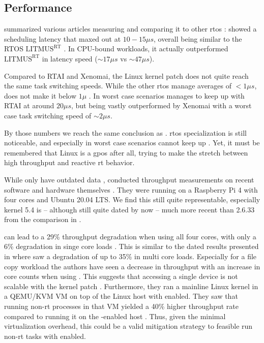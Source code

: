 \documentclass[10pt,twocolumn,a4paper]{article}
\begin{document}
\subsection{Performance}
\citeauthor{reghenzani_realtime_2019} summarized various articles measuring  and comparing it to other \acrshort{rtos} \cite{reghenzani_realtime_2019}:
 showed a scheduling latency that maxed out at $10 - 15\mu s$, overall being similar to the RTOS $\text{LITMUS}^{\text{RT}}$ \cite{litmusrt}.
In CPU-bound workloads, it actually outperformed $\text{LITMUS}^{\text{RT}}$ in latency speed ($\sim 17\mu s$ vs $\sim 47\mu s$).

Compared to RTAI and Xenomai, the Linux kernel patch does not quite reach the same task switching speeds.
While the other \acrshort{rtos} manage averages of $<1\mu s$,  does not make it below $1 \mu$ \cite{reghenzani_realtime_2019}.
In worst case scenarios  manages to keep up with RTAI at around $20\mu s$, but being vastly outperformed by Xenomai with a worst case task switching speed of $\sim 2\mu s$.

By those numbers we reach the same conclusion as \cite{reghenzani_realtime_2019}.
\acrshort{rtos} specialization is still noticeable, and especially in worst case scenarios  cannot keep up \cite{reghenzani_realtime_2019}.
Yet, it must be remembered that Linux is a \acrfull{gpos} after all, trying to make the stretch between high throughput and reactive \acrshort{rt} behavior.

While \citeauthor{reghenzani_realtime_2019} only have outdated data \cite{reghenzani_realtime_2019}, \citeauthor{li_performance_2023} conducted throughput measurements on recent software and hardware themselves \cite{li_performance_2023}.
They were running on a Raspberry Pi 4 with four cores and Ubuntu 20.04 LTS.
We find this still quite representable, especially kernel 5.4 is -- although still quite dated by now -- much more recent than 2.6.33 from the comparison in \cite{reghenzani_realtime_2019}.

 can lead to a 29\% throughput degradation when using all four cores, with only a 6\% degradation in singe core loads \cite{li_performance_2023}.
This is similar to the dated results presented in \cite{reghenzani_realtime_2019} where \citeauthor{reghenzani_realtime_2019} saw a degradation of up to 35\% in multi core loads.
Especially for a file copy workload the authors have seen a decrease in throughput with an increase in core counts when using  \cite{li_performance_2023}.
This suggests that accessing a single device is not scalable with the kernel patch \cite{li_performance_2023}.
Furthermore, they ran a mainline Linux kernel in a QEMU/KVM VM on top of the Linux host with  enabled.
They saw that running non-\acrshort{rt} processes in that VM yielded a 40\% higher throughput rate compared to running it on the -enabled host \cite{li_performance_2023}.
Thus, given the minimal virtualization overhead, this could be a valid mitigation strategy \cite{li_performance_2023} to feasible run non-\acrshort{rt} tasks with  enabled.

\printglossaries

\printbibliography
\end{document}
